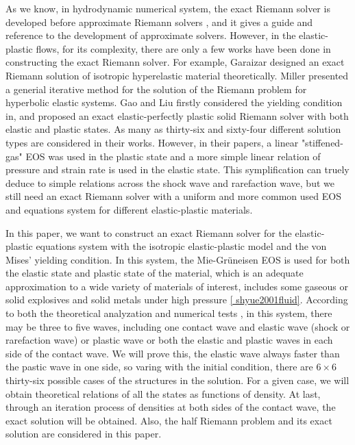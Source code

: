 \documentclass[review]{elsarticle}
\begin{document}
As we know, in hydrodynamic  numerical system, the exact Riemann solver is developed before approximate Riemann solvers \cite{godunov1959difference}, and it gives a guide and reference to the development of approximate solvers. However, in the elastic-plastic flows, for its complexity, there are only a few works have been done in constructing the exact Riemann solver. For example, 
Garaizar \cite{garaizar1991solution} designed an exact Riemann solution of isotropic hyperelastic material theoretically.  Miller \cite{miller2004iterative} presented a generial iterative method for the solution of the Riemann problem for hyperbolic elastic systems. Gao and Liu \cite{gao20171d,gao2018complete} firstly considered the yielding condition in, and proposed an exact elastic-perfectly plastic solid Riemann solver with both elastic and plastic states. As many as thirty-six \cite{gao20171d} and sixty-four \cite{gao2018complete} different solution types are considered in their works.
However, in their papers,  a linear  "stiffened-gas" EOS was used in the plastic state and a more simple linear relation of pressure and strain rate is used in the elastic state. This symplification can truely deduce to simple relations  across the shock wave and rarefaction wave, but we still need an exact Riemann solver with a uniform and more common used EOS and equations system for different elastic-plastic materials.

In this paper, we want to construct an exact Riemann solver for the elastic-plastic equations system with the  isotropic elastic-plastic model and the  von Mises' yielding condition. In this system, the Mie-Gr\"uneisen EOS is used for both the elastic state and plastic state of the material, which is an adequate approximation to a wide variety of materials of interest, includes some gaseous or solid explosives and solid metals under high pressure \ref{ shyue2001fluid}.  According to both the theoretical analyzation and numerical tests \cite{xiao1996numerical}, in this system, there may be three to five waves, including one contact wave and elastic wave (shock or rarefaction wave) or plastic wave or both the elastic and plastic waves in each side of the contact wave. We will prove this, the elastic wave always faster than the pastic wave in one side, so varing with the initial condition, there are $6\times 6$ thirty-six possible cases of the structures in the solution. For a given case, we will obtain theoretical relations of all the states as functions of density. At last,  through an iteration process of densities at both sides of the contact wave, the  exact solution will be obtained. Also, the half Riemann problem and its exact solution are considered in this paper.                        
\end{document}
